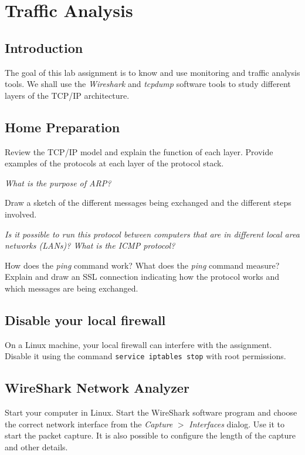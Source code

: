 \chapter{Traffic Analysis}

\section{Introduction}

The goal of this lab assignment is to know and use monitoring and traffic analysis tools. We shall use the \emph{Wireshark} and \emph{tcpdump} software tools to study different layers of the TCP/IP architecture.

\section{Home Preparation}

Review the TCP/IP model and explain the function of each layer. Provide examples of the protocols at each layer of the protocol stack.

\emph{What is the purpose of ARP?}

Draw a sketch of the different messages being exchanged and the different steps involved.

\emph{Is it possible to run this protocol between computers that are in different local area networks (LANs)? What is the ICMP protocol?}

How does the \emph{ping} command work?
What does the \emph{ping} command measure?
Explain and draw an SSL connection indicating how the protocol works and which messages are being exchanged.

\section{Disable your local firewall}

On a Linux machine, your local firewall can interfere with the assignment.
Disable it using the command \texttt{service iptables stop} with root permissions.

\section{WireShark Network Analyzer}

Start your computer in Linux. Start the WireShark software program and choose the correct network interface from the \emph{Capture} $>$ \emph{Interfaces} dialog. Use it to start the packet capture. It is also possible to configure the length of the capture and other details.

